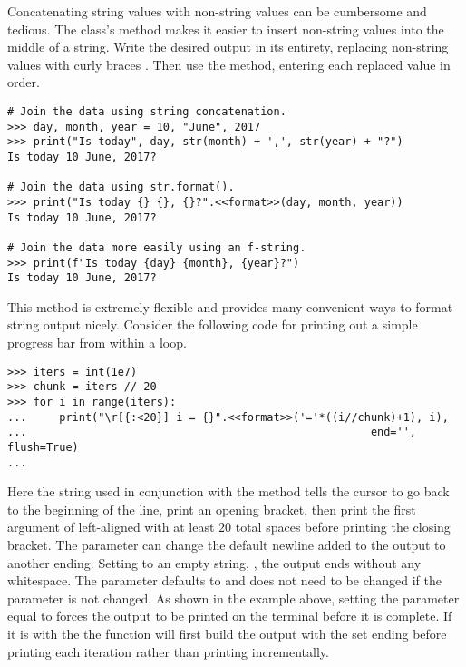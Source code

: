 Concatenating string values with non-string values can be cumbersome and tedious.
The  class's  method makes it easier to insert non-string values into the middle of a string.
Write the desired output in its entirety, replacing non-string values with curly braces \li{\{\}}.
Then use the  method, entering each replaced value in order.

\begin{lstlisting}
# Join the data using string concatenation.
>>> day, month, year = 10, "June", 2017
>>> print("Is today", day, str(month) + ',', str(year) + "?")
Is today 10 June, 2017?

# Join the data using str.format().
>>> print("Is today {} {}, {}?".<<format>>(day, month, year))
Is today 10 June, 2017?

# Join the data more easily using an f-string.
>>> print(f"Is today {day} {month}, {year}?")
Is today 10 June, 2017?
\end{lstlisting}

This method is extremely flexible and provides many convenient ways to format string output nicely.
Consider the following code for printing out a simple progress bar from within a loop.

\begin{lstlisting}
>>> iters = int(1e7)
>>> chunk = iters // 20
>>> for i in range(iters):
...     print("\r[{:<20}] i = {}".<<format>>('='*((i//chunk)+1), i),
...                                                     end='', flush=True)
...
\end{lstlisting}

Here the string  used in conjunction with the  method tells the cursor to go back to the beginning of the line, print an opening bracket, then print the first argument of  left-aligned with at least $20$ total spaces before printing the closing bracket. The   parameter can change the default newline added to the output to another ending. Setting to an empty string, , the output ends without any whitespace. The  parameter defaults to   and does not need to be changed if the   parameter is not changed. As shown in the example above, setting the parameter equal to  forces the output to be printed on the terminal before it is complete. If it is  with the   the  function will first build the output with the set ending before printing each iteration rather than printing incrementally.

